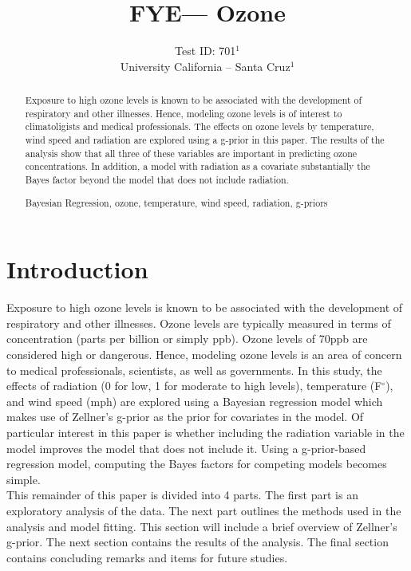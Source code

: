 \documentclass{../../tex_template/asaproc}
\title{FYE--- Ozone}
\author{
  Test ID: 701$^1$\\
  University California -- Santa Cruz$^1$\\
}
\begin{document}
\maketitle
\begin{abstract}
Exposure to high ozone levels is known to be associated with the development
of respiratory and other illnesses. Hence, modeling ozone levels is of interest
to climatoligists and medical professionals. The effects on ozone levels by
temperature, wind speed and radiation are explored using a g-prior in this 
paper. The results of the analysis show that all three of these variables are
important in predicting ozone concentrations. In addition, a model with
radiation as a covariate substantially the Bayes factor beyond the model
that does not include radiation.

\begin{keywords}
Bayesian Regression, ozone, temperature, wind speed, radiation, g-priors
\end{keywords}
\end{abstract}

\section{Introduction}
Exposure to high ozone levels is known to be associated with the development of
respiratory and other illnesses. Ozone levels are typically measured in terms
of concentration (parts per billion or simply ppb). Ozone levels of 70ppb are
considered high or dangerous. Hence, modeling ozone levels is an area of 
concern to medical professionals, scientists, as well as governments. In this
study, the effects of radiation (0 for low, 1 for moderate to high levels), 
temperature (F$^\circ$), and wind speed (mph) are explored using a Bayesian
regression model which makes use of Zellner's g-prior as the prior for covariates
in the model. Of particular interest in this paper is whether including the 
radiation variable in the model improves the model that does not include it.
Using a g-prior-based regression model, computing the Bayes factors for competing
models becomes simple.\\

This remainder of this paper is divided into 4 parts. The first part is an 
exploratory analysis of the data. The next part outlines the methods used in
the analysis and model fitting. This section will include a brief overview
of Zellner's g-prior. The next section contains the results of the analysis.
The final section contains concluding remarks and items for future studies.
\end{document}
